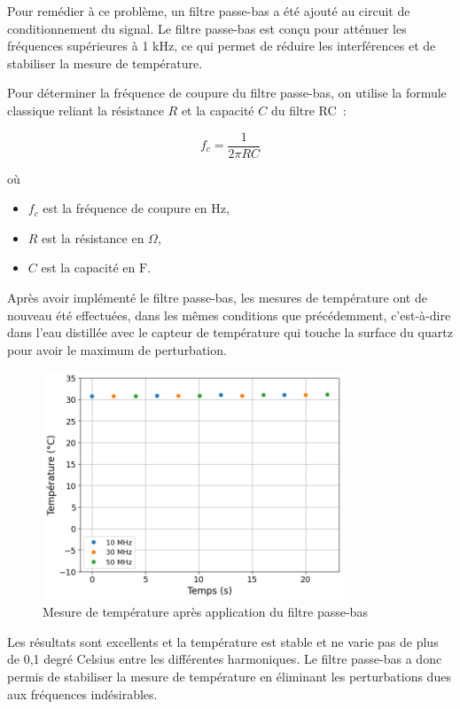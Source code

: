 Pour remédier à ce problème, un filtre passe-bas a été ajouté au circuit de conditionnement du signal.
Le filtre passe-bas est conçu pour atténuer les fréquences supérieures à 1 kHz, ce qui permet de réduire les interférences et de stabiliser la mesure de température.

Pour déterminer la fréquence de coupure du filtre passe-bas, on utilise la formule classique reliant la résistance $R$ et la capacité $C$ du filtre RC :

\begin{equation}
f_c = \frac{1}{2\pi RC}
\label{eq:frequence_coupure}
\end{equation}

où
\begin{itemize}
    \item $f_c$ est la fréquence de coupure en Hz,
    \item $R$ est la résistance en $\Omega$,
    \item $C$ est la capacité en $\mathrm{F}$.
\end{itemize}

Après avoir implémenté le filtre passe-bas, les mesures de température ont de nouveau été effectuées, dans les mêmes conditions que précédemment, c'est-à-dire dans l'eau distillée avec le capteur de température qui touche la surface du quartz pour avoir le maximum de perturbation.

\begin{figure}[H]
    \centering
    \includegraphics[width=0.8\textwidth]{assets/figures/TempFiltered.png}
    \caption{Mesure de température après application du filtre passe-bas}
    \label{fig:TempBruitFiltre}
\end{figure}

Les résultats sont excellents et la température est stable et ne varie pas de plus de 0,1 degré Celsius entre les différentes harmoniques.
Le filtre passe-bas a donc permis de stabiliser la mesure de température en éliminant les perturbations dues aux fréquences indésirables.


